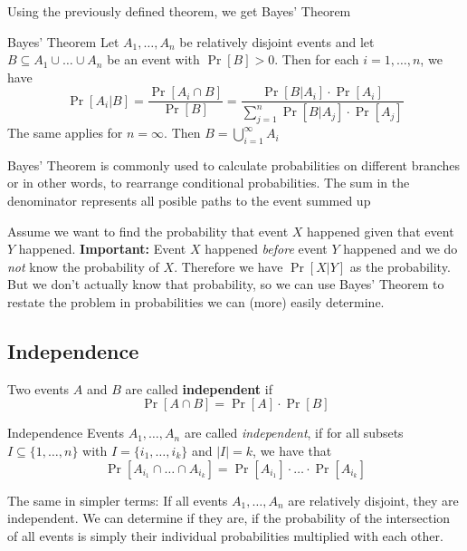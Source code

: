 Using the previously defined theorem, we get Bayes' Theorem

\setcounter{all}{15}
\begin{theorem}[]{Bayes' Theorem}
    Let $A_1, \ldots, A_n$ be relatively disjoint events and let $B \subseteq A_1 \cup \ldots \cup A_n$ be an event with $\Pr[B] > 0$. Then for each $i = 1, \ldots, n$, we have
    \[
        \Pr[A_i|B] = \frac{\Pr[A_i \cap B]}{\Pr[B]} = \frac{\Pr[B|A_i] \cdot \Pr[A_i]}{\sum_{j = 1}^{n} \Pr[B|A_j] \cdot \Pr[A_j]}
    \]
    The same applies for $n = \infty$. Then $B = \bigcup_{i = 1}^{\infty} A_i$
\end{theorem}

 Bayes' Theorem is commonly used to calculate probabilities on different branches or in other words, to rearrange conditional probabilities. The sum in the denominator represents all posible paths to the event summed up

\inlineex \hspace{0mm} Assume we want to find the probability that event $X$ happened given that event $Y$ happened. \textbf{Important:} Event $X$ happened \textit{before} event $Y$ happened and we do \textit{not} know the probability of $X$. Therefore we have $\Pr[X|Y]$ as the probability. But we don't actually know that probability, so we can use Bayes' Theorem to restate the problem in probabilities we can (more) easily determine.


\newpage
\subsection{Independence}
\setcounter{all}{18}
 Two events $A$ and $B$ are called \textbf{independent} if
\[
    \Pr[A \cap B] = \Pr[A] \cdot \Pr[B]
\]

\setcounter{all}{22}
\begin{definition}[]{Independence}
    Events $A_1, \ldots, A_n$ are called \textit{independent}, if for all subsets $I \subseteq \{1, \ldots, n\}$ with $I = \{i_1, \ldots, i_k\}$ and $|I| = k$, we have that
    \[
        \Pr[A_{i_1} \cap \ldots \cap A_{i_k}] = \Pr[A_{i_1}] \cdot \ldots \cdot \Pr[A_{i_k}]
    \]
\end{definition}

The same in simpler terms: If all events $A_1, \ldots, A_n$ are relatively disjoint, they are independent. We can determine if they are, if the probability of the intersection of all events is simply their individual probabilities multiplied with each other.

